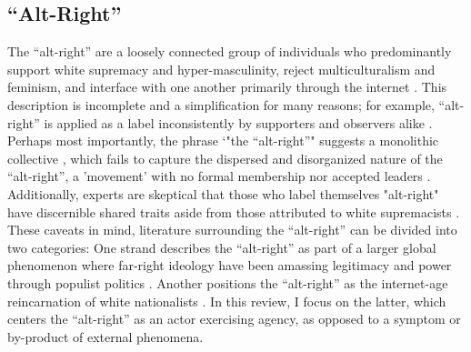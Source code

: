 \documentclass[acmlarge, screen, authorversion]{acmart}
\begin{document}
\subsection{``Alt-Right''}

The ``alt-right” are a loosely connected group of individuals who predominantly support white supremacy and hyper-masculinity, reject multiculturalism and feminism, and interface with one another primarily through the internet
\cite{sternProudBoysWhite2019, mainRiseAltRight2018, nagleKillAllNormies2017, hawleyMakingSenseAltright2017}. 
This description is incomplete and a simplification for
many reasons; for example, ``alt-right'' is applied as a label inconsistently by supporters and observers alike \cite{hawleyMakingSenseAltright2017}. Perhaps most importantly, the phrase `"the ``alt-right''" suggests a monolithic collective \cite{massanariRethinkingResearchEthics2018}, which fails to capture the dispersed and disorganized \cite{martinDissectingTrumpMost2017} nature of the ``alt-right'', a 'movement' with no formal membership nor accepted leaders \cite{hawleyMakingSenseAltright2017}. Additionally, experts are skeptical that those who label themselves "alt-right" have discernible shared traits aside from those attributed to white supremacists
\cite{gallaherMainstreamingWhiteSupremacy2020, johndaniszewskiWritingAltright2016}. These caveats in mind, literature surrounding the ``alt-right” can be divided into two categories: One strand describes the ``alt-right'' as part
of a larger global phenomenon where far-right ideology have been
amassing legitimacy and power through populist politics \cite{cammaertsMainstreamingExtremeRightWing2018, worthMorbidSymptomsGlobal2019}. Another positions the
``alt-right” as the internet-age reincarnation of white nationalists
\cite{hawleyMakingSenseAltright2017, mainRiseAltRight2018}. In this review,
I focus on the latter, which centers the ``alt-right'' as an actor exercising agency, as opposed to a symptom or by-product of external phenomena.
\end{document}
